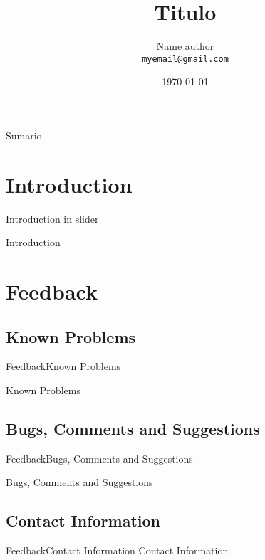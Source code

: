 \documentclass[10pt]{beamer}
\title[Title]{Titulo}
\subtitle{}
\date{\today}
\author[Silvana Trindade] 
{
  Name author\\
  \href{mailto:myemail@gmail.com}{{\tt myemail@gmail.com}}
}
\institute[
  {\texttt{[image: AAUgraphics/Logo]}}\\ ]
{
  Course\\
  Universidad\\
}
\begin{document}
{\aauwavesbg
\begin{frame} 
  \titlepage
\end{frame}
}
\begin{frame}{Sumario}{}
\tableofcontents
\end{frame}


\section{Introduction}

	Introduction in slider
	
\begin{frame}{Introduction}{}
 
\end{frame}


\section{Feedback}

\subsection{Known Problems}
\begin{frame}{Feedback}{Known Problems}

  Known Problems
  
\end{frame}


\subsection{Bugs, Comments and Suggestions}
\begin{frame}{Feedback}{Bugs, Comments and Suggestions}

 	Bugs, Comments and Suggestions
 	
\end{frame}

\subsection{Contact Information}
\begin{frame}{Feedback}{Contact Information}
Contact Information
  \begin{center}
    \insertauthor\\
  \end{center}  
\end{frame}


{\aauwavesbg
	\begin{frame}
	\end{frame}
}
\end{document}
